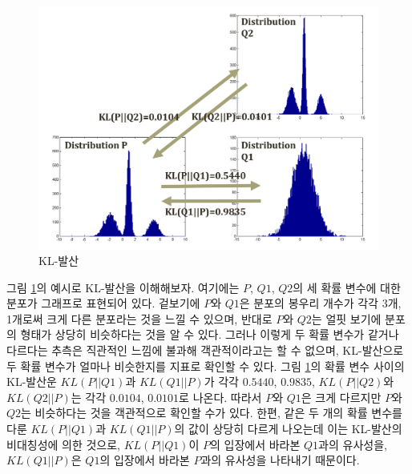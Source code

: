 \documentclass[a4paper]{oblivoir}
\begin{document}
\begin{figure}[ht] \centering 
\includegraphics[scale=0.5]{fig8_14.png} 
\caption{KL-발산}
\label{fig:8-14}
\end{figure}

그림 \ref{fig:8-14}의 예시로 KL-발산을 이해해보자. 여기에는 $P$, $Q1$, $Q2$의 세 확률 변수에 대한 분포가 그래프로 표현되어 있다. 겉보기에 $P$와 $Q1$은 분포의 봉우리 개수가 각각 3개, 1개로써 크게 다른 분포라는 것을 느낄 수 있으며, 반대로 $P$와 $Q2$는 얼핏 보기에 분포의 형태가 상당히 비슷하다는 것을 알 수 있다. 그러나 이렇게 두 확률 변수가 같거나 다르다는 추측은 직관적인 느낌에 불과해 객관적이라고는 할 수 없으며, KL-발산으로 두 확률 변수가 얼마나 비슷한지를 지표로 확인할 수 있다. 그림 \ref{fig:8-14}의 확률 변수 사이의 KL-발산운 $KL(P || Q1)$과 $KL(Q1 || P)$가 각각 $0.5440$, $0.9835$, $KL(P || Q2)$와 $KL(Q2 || P)$는 각각 $0.0104$, $0.0101$로 나온다. 따라서 $P$와 $Q1$은 크게 다르지만 $P$와 $Q2$는 비슷하다는 것을 객관적으로 확인할 수가 있다. 한편, 같은 두 개의 확률 변수를 다룬 $KL(P || Q1)$과 $KL(Q1 || P)$의 값이 상당히 다르게 나오는데 이는 KL-발산의 비대칭성에 의한 것으로, $KL(P || Q1)$이 $P$의 입장에서 바라본 $Q1$과의 유사성을, $KL(Q1 || P)$은 $Q1$의 입장에서 바라본 $P$과의 유사성을 나타내기 때문이다. \\
\end{document}

